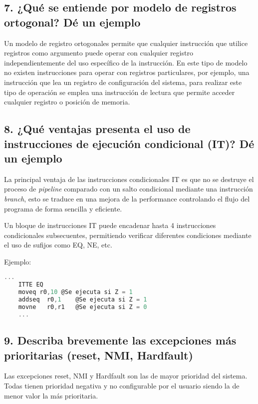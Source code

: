 \documentclass[10pt,a4paper,twoside,spanish]{article}	%
\begin{document}
\subsection*{7. ¿Qué se entiende por modelo de registros ortogonal? Dé un ejemplo}

Un modelo de registro ortogonales permite que cualquier instrucción que utilice registros como argumento puede operar con cualquier registro independientemente del uso específico de la instrucción. En este tipo de modelo no existen instrucciones para operar con registros particulares, por ejemplo, una instrucción que lea un registro de configuración del sistema, para realizar este tipo de operación se emplea una instrucción de lectura que permite acceder cualquier registro o posición de memoria.


\subsection*{8. ¿Qué ventajas presenta el uso de instrucciones de ejecución condicional (IT)? Dé un ejemplo}

La principal ventaja de las instrucciones condicionales IT es que no se destruye el proceso de \textit{pipeline} comparado con un salto condicional mediante una instrucción \textit{branch}, esto se traduce en una mejora de la performance controlando el flujo del programa de forma sencilla y eficiente.

Un bloque de instrucciones IT puede encadenar hasta 4 instrucciones condicionales subsecuentes, permitiendo verificar diferentes condiciones mediante el uso de sufijos como EQ, NE, etc.

Ejemplo:

\begin{lstlisting}[language=C]
	...
	ITTE EQ
	moveq r0,10	@Se ejecuta si Z = 1
	addseq	r0,1	@Se ejecuta si Z = 1
	movne	r0,r1	@Se ejecuta si Z = 0		
	...

\end{lstlisting}


\subsection*{9. Describa brevemente las excepciones más prioritarias (reset, NMI, Hardfault)}

Las excepciones reset, NMI y Hardfault son las de mayor prioridad del sistema. Todas tienen prioridad negativa y no configurable por el usuario siendo la de menor valor la más prioritaria.
\end{document}
